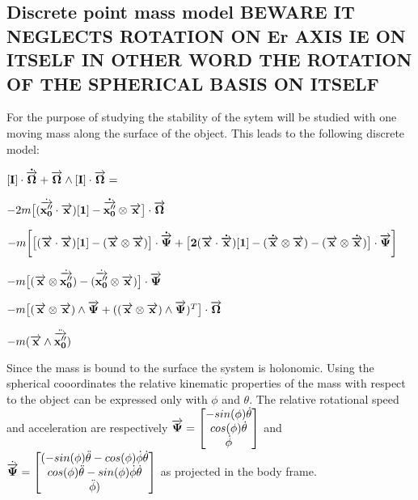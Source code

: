 \subsection{Discrete point mass model BEWARE IT NEGLECTS ROTATION ON Er AXIS IE ON ITSELF IN OTHER WORD THE ROTATION OF THE SPHERICAL BASIS ON ITSELF}
\label{Discrete point mass model}
For the purpose of studying the stability of the sytem will be studied with one moving mass along the surface of the object. This leads to the following discrete model:

$[\bf I]\cdot \dot{\overrightarrow{\bf \Omega}} + \overrightarrow{\bf \Omega} \wedge [\bf I]\cdot \overrightarrow{\bf \Omega}=$

$- 2m \big [(\dot{\overrightarrow{\bf x''_{0}}} \cdot \overrightarrow{\bf x})[\bf 1] - \dot{\overrightarrow{\bf x''_{0}}}\otimes \overrightarrow{\bf x}\big ]\cdot \overrightarrow{\bf \Omega}$

$-m \bigg [ \big [(\overrightarrow{\bf x} \cdot \overrightarrow{\bf x})[\bf 1]-(\overrightarrow{\bf x} \otimes \overrightarrow{\bf x}) \big] \cdot \dot{\overrightarrow{\bf \Psi}} + \big [2(\overrightarrow{\bf x}\cdot \dot{\overrightarrow{\bf x}})[\bf 1]-(\dot{\overrightarrow{\bf x}} \otimes \overrightarrow{\bf x})-(\overrightarrow{\bf x} \otimes \dot{\overrightarrow{\bf x}}) \big ]\cdot \overrightarrow{\bf \Psi} \bigg ]$

$-m{\big [(\overrightarrow{\bf x}\otimes \dot{\overrightarrow{\bf x''_{0}}}) - (\dot{\overrightarrow{\bf x''_{0}}}\otimes \overrightarrow{\bf x}) \big ]\cdot \overrightarrow{\bf \Psi}}$

$-m {\big [(\overrightarrow{\bf x}\otimes \overrightarrow{\bf x})\wedge \overrightarrow{\bf \Psi}+((\overrightarrow{\bf x}\otimes \overrightarrow{\bf x})\wedge \overrightarrow{\bf \Psi})^{T}\big ] \cdot \overrightarrow{\bf \Omega}}$

$-m(\overrightarrow{\bf x}\wedge \ddot{\overrightarrow{\bf x''_{0}}})$


Since the mass is bound to the surface the system is holonomic. Using the spherical cooordinates the relative kinematic properties of the mass with respect to the object can be expressed only with $\phi$ and $\theta$. The relative rotational speed and acceleration are respectively $\overrightarrow{\bf \Psi}= \begin{bmatrix}-sin(\phi)\dot \theta\\ cos(\phi) \dot \theta \\ \dot \phi  \end{bmatrix}$ and  $\dot{\overrightarrow{\bf\Psi}}=\begin{bmatrix}(-sin(\phi) \ddot \theta -cos(\phi) \dot \phi \dot \theta\\ cos(\phi) \ddot \theta -sin(\phi) \dot\phi \dot\theta\\ \ddot \phi)\end{bmatrix}$ as projected in the body frame.

